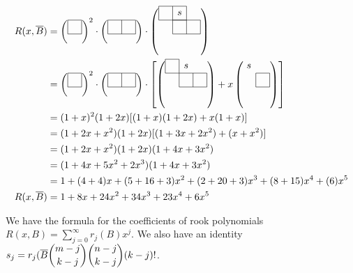\documentclass{article}
\begin{document}
 \begin{align}
R(x,\overline{B}) &= \left( 
\begin{tikzpicture}[scale=0.5]
     \draw (0,0) grid (1,1);
   \end{tikzpicture} \right)^2
   \cdot \left( 
   \begin{tikzpicture}[scale=0.5]
     \draw (0,0) grid (2,1);
   \end{tikzpicture} 
    \right) \cdot \left( 
   \begin{tikzpicture}[scale=0.5]
     \draw (1,0) grid (3,1);
         \draw (0,1) grid (2,2);
      \path (1.5,1.5) node (s1) {$s$};
   \end{tikzpicture} \right)  \label{eqn:boards} \\
  &= \left( 
  \begin{tikzpicture}[scale=0.5]
     \draw (0,0) grid (1,1);
   \end{tikzpicture} \right)^2
   \cdot \left( 
   \begin{tikzpicture}[scale=0.5]
     \draw (0,0) grid (2,1);
   \end{tikzpicture} 
    \right) \cdot \left[ \left(
   \begin{tikzpicture}[scale=0.5]
     \draw (0,1) grid (1,2);
         \draw (1,0) grid (3,1);
         \path (1.5,1.5) node (s1) {$s$};
   \end{tikzpicture} \right) + 
   x  \left(
   \begin{tikzpicture}[scale=0.5]
     \draw (2,0) grid (3,1);
     \path (1.5,1.5) node (s1) {$s$};
   \end{tikzpicture} \right) \right]  \\
   &= (1+x)^2 (1+2x) [(1+x) (1+2x) + x(1+x)] \\
   &= (1+2x+x^2) (1+2x) [(1+3x+2x^2) + (x+x^2)] \\
   &= (1+2x+x^2) (1+2x) (1+4x+3x^2)  \\
   &= (1 + 4x + 5 x^2 + 2 x^3) (1+4x+3x^2)  \\
   &= 1 + (4+4)x + (5+16+3)x^2 + (2+20+3)x^3 +(8+15)x^4+(6)x^5  \\
R(x,\overline{B})  &= 1+8x + 24 x^2 + 34 x^3 + 23 x^4 + 6 x^5
\end{align}
 
 We have the formula for the coefficients of rook polynomials 
 $ R(x,B) = \sum_{j=0}^{\infty} r_j(B) x^j $.
 We also have an identity 
 $ s_j = r_j(\overline{B} \dbinom{m-j}{k-j} \dbinom{n-j}{k-j} (k-j)! $.
 
\end{document}

